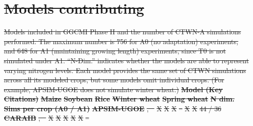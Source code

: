 \documentclass[gmd, manuscript]{copernicus} %
\providecommand{\DIFdel}[1]{{\protect\color{red}\sout{#1}}}                      %
\providecommand{\DIFdelbegin}{} %
\providecommand{\DIFdelFL}[1]{\DIFdel{#1}} %
\begin{document}
\DIFdelbegin \section{\DIFdel{Models contributing}}
\addtocounter{section}{-1}%
{%
\DIFdelFL{Models included in GGCMI Phase II and the number of CTWN-A simulations performed. 
The maximum number is 756 for A0 (no adaptation) experiments, and 648 for A1 (maintaining growing length) experiments, since T0 is not simulated under A1. ``N-Dim.'' indicates whether the models are able to represent varying nitrogen levels.
Each model provides the same set of CTWN simulations across all its modeled crops, but some models omit individual crops. (For example, APSIM-UGOE does not simulate winter wheat.)
}}
\textbf{\DIFdelFL{Model (Key Citations)}}%
\textbf{\DIFdelFL{Maize}}%
\textbf{\DIFdelFL{Soybean}}%
\textbf{\DIFdelFL{Rice}}%
\textbf{\DIFdelFL{Winter wheat}}%
\textbf{\DIFdelFL{Spring wheat}}%
\textbf{\DIFdelFL{N dim.}}%
\textbf{\DIFdelFL{Sims per crop (A0 / A1)}}%
\textbf{\DIFdelFL{APSIM-UGOE}}%
\DIFdelFL{,   \mbox{%
\citet{KEATING2003267, HOLZWORTH2014327}}\hspace{0pt}%
}%
\DIFdelFL{X}%
\DIFdelFL{X}%
\DIFdelFL{X}%
\DIFdelFL{--}%
\DIFdelFL{X}%
\DIFdelFL{X}%
\DIFdelFL{44 / 36}%
\textbf{\DIFdelFL{CARAIB}}%
\DIFdelFL{,       \mbox{%
\citet{Dury2011, Pirttioja2015}}\hspace{0pt}%
}%
\DIFdelFL{X}%
\DIFdelFL{X}%
\DIFdelFL{X}%
\DIFdelFL{X}%
\DIFdelFL{X}%
\DIFdelFL{--}%
\end{document}
